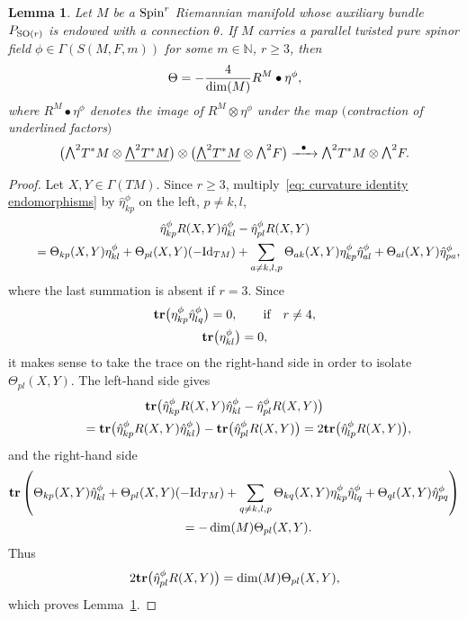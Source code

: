 \documentclass[pdftex]{sigma}
\newcommand{\ext}{\raise1pt\hbox{\small$\bigwedge$}}
\newcommand{\tr}{\mbox{\bf tr}}
\numberwithin{equation}{section}
\newtheorem{Lemma}[Theorem]{Lemma}
\begin{document}
\begin{Lemma}\label{Lemma4.6} Let $M$ be a ${\rm Spin}^r$ Riemannian manifold whose auxiliary bundle $P_{{\rm SO}(r)}$ is endowed with a connection $\theta$. If $M$ carries a parallel twisted pure spinor field $\phi\in\Gamma(S(M,F,m))$ for some $m\in\mathbb{N}$, $r\geq 3$, then
\begin{gather}
\Theta=-{4\over \dim(M)}R^M\bullet \eta^\phi,\label{eq: first version second SW equation}
\end{gather}
where $R^M\bullet \eta^\phi$ denotes the image of $R^M\otimes \eta^\phi$ under the map $($contraction of underlined factors$)$
\begin{gather*}
\big(\ext^2 T^*M\otimes \underline{\ext^2 T^*M}\big)\otimes\big(\underline{\ext^2 T^*M}\otimes\ext^2 F\big)
 \xrightarrow{\,\,\,\,\bullet\,\,\,\,} \ext^2 T^*M\otimes\ext^2 F.
\end{gather*}
\end{Lemma}
\begin{proof} Let $X,Y\in\Gamma(TM)$. Since $r\geq 3$, multiply~\eqref{eq: curvature identity endomorphisms} by $\hat{\eta}^\phi_{kp}$ on the left, $p\not = k,l$,
\begin{gather*}
\hat{\eta}^\phi_{kp}{R(X,Y)}\hat{\eta}^\phi_{kl}-\hat{\eta}^\phi_{pl}{R(X,Y)} \\
\qquad {} = \Theta_{kp}(X,Y)\eta_{kl}^\phi + \Theta_{pl}(X,Y)(-{\rm Id}_{TM}) + \sum_{a\not= k,l,p} \Theta_{ak}(X,Y) \eta_{kp}^\phi\hat{\eta}^\phi_{al}+ \Theta_{al}(X,Y)\hat{\eta}^\phi_{pa},
\end{gather*}
where the last summation is absent if $r=3$. Since
\begin{gather*}
\tr\big(\eta_{kp}^\phi\hat{\eta}^\phi_{lq}\big) = 0, \qquad \text{if} \quad r\not = 4,\\
\tr\big(\eta_{kl}^\phi\big) = 0,
\end{gather*}
it makes sense to take the trace on the right-hand side in order to isolate $\Theta_{pl}(X,Y)$. The left-hand side gives
\begin{gather*}
\tr\big(\hat{\eta}^\phi_{kp}{R(X,Y)}\hat{\eta}^\phi_{kl}-\hat{\eta}^\phi_{pl}{R(X,Y)}\big)\\
\qquad {} =
\tr\big(\hat{\eta}^\phi_{kp}{R(X,Y)}\hat{\eta}^\phi_{kl}\big)-\tr\big(\hat{\eta}^\phi_{pl}{R(X,Y)}\big)
 = 2\tr\big(\hat{\eta}^\phi_{lp}{R(X,Y)}\big),
\end{gather*}
and the right-hand side
\begin{gather*}
\tr\left(\Theta_{kp}(X,Y)\hat\eta_{kl}^\phi + \Theta_{pl}(X,Y)(-{\rm Id}_{TM})
 + \sum_{q\not= k,l,p} \Theta_{kq}(X,Y) \eta_{kp}^\phi\hat{\eta}^\phi_{lq}+ \Theta_{ql}(X,Y)\hat{\eta}^\phi_{pq}\right)\\
 \qquad{} = -\dim(M)\Theta_{pl}(X,Y).
\end{gather*}
Thus
\begin{gather}
2\tr\big(\hat{\eta}^\phi_{pl}{R(X,Y)}\big)=\dim(M)\Theta_{pl}(X,Y), \label{eq: isolation Theta}
\end{gather}
which proves Lemma~\ref{Lemma4.6}.
\end{proof}
\end{document}
